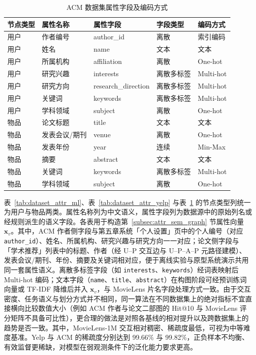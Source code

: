 \begin{table}[H]
    \centering
    \caption{ACM 数据集属性字段及编码方式}
    \label{tab:dataset_attr_acm}
    \begin{tabular}{lllll}
        \toprule
        节点类型 & 属性名称 & 属性字段 & 字段类型 & 编码方式 \\
        \midrule
        用户 & 作者编号 & author\_id & 离散 & 索引编码 \\
        用户 & 姓名 & name & 文本 & 文本 \\
        用户 & 所属机构 & affiliation & 离散 & One-hot \\
        用户 & 研究兴趣 & interests & 离散多标签 & Multi-hot \\
        用户 & 研究方向 & research\_direction & 离散多标签 & Multi-hot \\
        用户 & 关键词 & keywords & 离散多标签 & Multi-hot \\
        用户 & 学科领域 & subject & 离散 & One-hot \\
        物品 & 论文标题 & title & 文本 & 文本 \\
        物品 & 发表会议/期刊 & venue & 离散 & One-hot \\
        物品 & 发表年份 & year & 连续 & Min-Max \\
        物品 & 摘要 & abstract & 文本 & 文本 \\
        物品 & 关键词 & keywords & 离散多标签 & Multi-hot \\
        物品 & 学科领域 & subject & 离散 & One-hot \\
        \bottomrule
    \end{tabular}
\end{table}

表~\ref{tab:dataset_attr_ml}、表~\ref{tab:dataset_attr_yelp} 与表~\ref{tab:dataset_attr_acm} 的节点类型列统一为用户与物品两类。属性名称列为中文语义，属性字段列为数据源中的原始列名或经规则派生的语义字段。各表用于构造第~\ref{subsec:attr_sem_graph} 节属性向量 $\mathbf{x}_v$。其中，ACM 作者侧字段与第五章系统「个人设置」页中的个人编号（对应 \texttt{author\_id}）、姓名、所属机构、研究兴趣与研究方向一一对应；论文侧字段与「学术推荐」列表中的标题、作者（经 U--P 交互边与 U--P--A--P 元路径建模）、发表会议/期刊、年份、摘要及关键词相对应，便于离线实验与原型系统演示共用同一套属性语义。离散多标签字段（如 \texttt{interests}、\texttt{keywords}）经词表映射后 Multi-hot 编码；文本字段（\texttt{name}、\texttt{title}、\texttt{abstract}）在构图阶段可经预训练词向量或 TF-IDF 降维后并入 $\mathbf{x}_v$，与 MovieLens 片名字段处理方式一致。由于交互密度、任务语义与划分方式并不相同，同一算法在不同数据集上的绝对指标不宜直接横向比较数值大小（例如 ACM 作者与论文二部图的 Hit@10 与 MovieLens 评分矩阵不具备可比性），更合理的做法是对照各基线的相对提升以及跨数据集上的趋势是否一致。其中，MovieLens-1M 交互相对稠密、稀疏度最低，可视为中等难度基准。Yelp 与 ACM 的稀疏度分别达到 99.66\% 与 99.82\%，正负样本不均衡、有效监督更稀缺，对模型在弱观测条件下的泛化能力要求更高。

